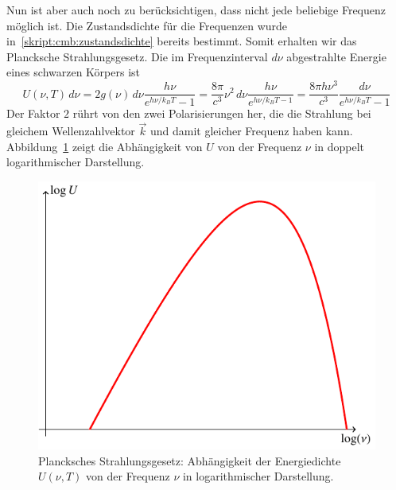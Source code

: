 Nun ist aber auch noch zu berücksichtigen, dass nicht jede beliebige
Frequenz möglich ist.
Die Zustandsdichte für die Frequenzen wurde
in~\eqref{skript:cmb:zustandsdichte} bereits bestimmt.
Somit erhalten wir das Plancksche Strahlungsgesetz.
Die im Frequenzinterval $d\nu$ abgestrahlte Energie eines
schwarzen Körpers ist
\begin{equation}
U(\nu,T)\,d\nu
=
2g(\nu)\,d\nu
\frac{h\nu}{e^{h\nu/k_BT}-1}
=
\frac{8\pi}{c^3}\nu^2\,d\nu\frac{h\nu}{e^{h\nu/k_BT-1}}
=
\frac{8\pi h\nu^3}{c^3}\frac{d\nu}{e^{h\nu/k_BT}-1}
\label{skript:cmb:plancknu}
\end{equation}
Der Faktor $2$ rührt von den zwei Polarisierungen her, die die Strahlung
bei gleichem Wellenzahlvektor $\vec{k}$ und damit gleicher Frequenz haben
kann.
Abbildung~\ref{skript:cmb:planckU} zeigt die Abhängigkeit von $U$ von
der Frequenz $\nu$ in doppelt logarithmischer Darstellung.
\begin{figure}
\centering
\includegraphics{chapters/tikz/planck1.pdf}
\caption{Plancksches Strahlungsgesetz: Abhängigkeit der Energiedichte
$U(\nu,T)$ von der Frequenz $\nu$ in logarithmischer Darstellung.
\label{skript:cmb:planckU}}
\end{figure}


